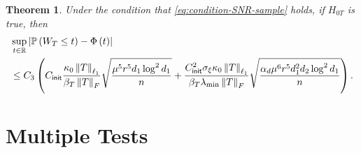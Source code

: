 \documentclass[12pt]{article}
\newcommand{\tF}{{\rm F}}
\newcommand{\norm}[1]{\left\lVert#1\right\rVert}
\newcommand{\cP}{\mathcal{P}}
\newcommand{\init}{{\mathsf{init}}}
\newtheorem{Theorem}{Theorem}
\theoremstyle{plain}
\begin{document}
\begin{sloppypar}
{%


\begin{Theorem}\label{thm:asymp-normal-varest} 
	Under the condition that \eqref{eq:condition-SNR-sample} holds, if $H_{0T}$ is true, then
$$
\begin{aligned}
    &\sup _{t\in \mathbb{R}}\left|\mathbb{P}\left(W_{T} \leq t\right)-\Phi\left(t\right)\right|
    \\
    &
\le C_3\left(  C_{\init}   \frac{\kappa_0\norm{T}_{\ell_1}}{\beta_T \norm{T}_{\tF}} \sqrt{\frac{ \mu^{5} r^5 d_1 \log^2 d_1  }{ n}} +  \frac{ C_{\init}^2\sigma_{\xi}  \kappa_0 \norm{T}_{\ell_1} }{\beta_T \lambda_{\min}  \norm{T}_\tF }\sqrt{\frac{\alpha_d \mu^{6} r^{5 } d_1^2 d_2  \log^2 d_1 }{ n } } \right).
\end{aligned} %
$$
\end{Theorem}
}



 







\section{Multiple Tests}\label{sec:FDR-SDA}


\end{sloppypar}
\end{document}
